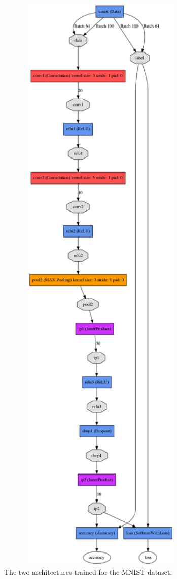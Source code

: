\documentclass[5pt]{article}
\begin{document}
\begin{figure}[T]
  \includegraphics[width=0.9\textwidth]{images/mnist_arch2.png}
  \caption{The two architectures trained for the MNIST dataset.}
\label{fig:mnist_architectures}
\end{figure}
\end{document}

